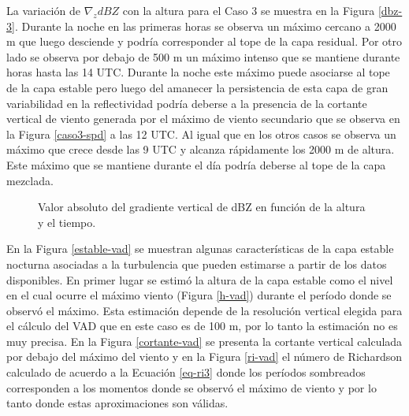 \documentclass[12pt,spanish,oneside, a4paper]{book}
\begin{document}
La variación de \(\nabla_z dBZ\) con la altura para el Caso 3 se muestra
en la Figura \ref{dbz-3}. Durante la noche en las primeras horas se
observa un máximo cercano a 2000 m que luego desciende y podría
corresponder al tope de la capa residual. Por otro lado se observa por
debajo de 500 m un máximo intenso que se mantiene durante horas hasta
las 14 UTC. Durante la noche este máximo puede asociarse al tope de la
capa estable pero luego del amanecer la persistencia de esta capa de
gran variabilidad en la reflectividad podría deberse a la presencia de
la cortante vertical de viento generada por el máximo de viento
secundario que se observa en la Figura \ref{caso3-spd} a las 12 UTC. Al
igual que en los otros casos se observa un máximo que crece desde las 9
UTC y alcanza rápidamente los 2000 m de altura. Este máximo que se
mantiene durante el día podría deberse al tope de la capa mezclada.

\begin{figure}

{\centering {}\newline{}\newline{}

}

\caption{Valor absoluto del gradiente vertical de dBZ en función de la altura y el tiempo. \label{pblh-dbz}}\label{fig:pblh-dbz}
\end{figure}

En la Figura \ref{estable-vad} se muestran algunas características de la
capa estable nocturna asociadas a la turbulencia que pueden estimarse a
partir de los datos disponibles. En primer lugar se estimó la altura de
la capa estable como el nivel en el cual ocurre el máximo viento (Figura
\ref{h-vad}) durante el período donde se observó el máximo. Esta
estimación depende de la resolución vertical elegida para el cálculo del
VAD que en este caso es de 100 m, por lo tanto la estimación no es muy
precisa. En la Figura \ref{cortante-vad} se presenta la cortante
vertical calculada por debajo del máximo del viento y en la Figura
\ref{ri-vad} el número de Richardson calculado de acuerdo a la Ecuación
\ref{eq-ri3} donde los períodos sombreados corresponden a los momentos
donde se observó el máximo de viento y por lo tanto donde estas
aproximaciones son válidas.
\end{document}
